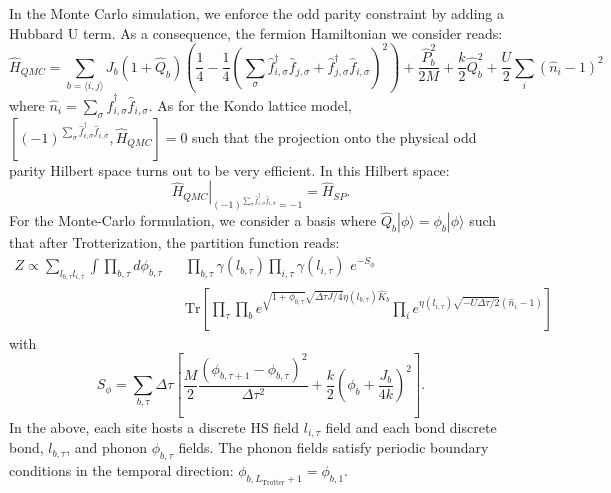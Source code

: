  In the  Monte Carlo  simulation,  we  enforce  the odd parity constraint  by   adding  a  Hubbard  U  term.  As  a  consequence,  the  fermion  Hamiltonian  we  consider  reads: 
 \begin{equation}
	\hat{H}_{QMC}  =       \sum_{b=\langle  i, j \rangle }  J_b   \left( 1 + \hat{Q}_{b} \right)  \left( \frac{1}{4}  -\frac{1}{4} \left( \sum_{\sigma}   \hat{f}^{\dagger}_{i,\sigma}  \hat{f}^{\phantom\dagger}_{j,\sigma}    + \hat{f}^{\dagger}_{j,\sigma}  \hat{f}^{\phantom\dagger}_{i,\sigma}   \right)^2    \right)    +  
	   \frac{\hat{P}_{b} ^2 }{2M}   +    \frac{k}{2} \hat{Q}_{b} ^2      +   \frac{U}{2}\sum_i \left(   \hat{n}_i -1 \right)^2
\end{equation}
where  $\hat{n}_i  =  \sum_{\sigma} \hat{f}^{\dagger}_{i,\sigma}\hat{f}^{\phantom\dagger}_{i,\sigma}$.       As  for the Kondo  lattice  model,   
$\left[ (-1)^{ \sum_{\sigma} \hat{f}^{\dagger}_{i,\sigma}  \hat{f}^{\phantom\dagger}_{i,\sigma} },  \hat{H}_{QMC}  \right]   = 0   $  such  that  the projection
onto the  physical odd  parity  Hilbert  space   turns out  to be  very  efficient.   In this  Hilbert  space: 
\begin{equation}
   \left. \hat{H}_{QMC} \right|_{ (-1)^{ \sum_{\sigma} \hat{f}^{\dagger}_{i,\sigma}  \hat{f}^{\phantom\dagger}_{i,\sigma} }  = -1}  =  \hat{H}_{SP}.
\end{equation}
For  the Monte-Carlo  formulation,  we  consider  a  basis  where  $ \hat{Q}_b  | \phi \rangle =   \phi_b  | \phi \rangle $  such  that   after  Trotterization,  the  partition  function  reads: 
\begin{eqnarray} 
	Z     \propto   \sum_{l_{b,\tau}  l_{i,\tau}}  \int  \prod_{b,\tau} d \phi_{b,\tau}     & &   
	  \prod_{b,\tau} \gamma(l_{b,\tau}) \prod_{i,\tau} \gamma(l_{i,\tau})  \,  \, 
	  e^{-S_{\phi} }   \\  & &   \text{Tr}\left[  \prod_{\tau}     \prod_{b}  e^{ \sqrt{1 + \phi_{b,\tau}}  \sqrt{\Delta  \tau J/4}  \eta(l_{b,\tau})\hat{K}_b }  
	    \prod_{i}  e^{ \eta(l_{i,\tau})  \sqrt{- U \Delta \tau / 2} \left(  \hat{n}_i -  1 \right)} \right]   \nonumber 
\end{eqnarray}
with 
\begin{equation}
	S_{\phi} =   \sum_{b, \tau}  \Delta  \tau \left[  \frac{M}{2} \frac{ \left(  \phi_{b,\tau + 1}  -  \phi_{b,\tau}  \right)^2 } {\Delta  \tau ^2  }  +  \frac{k}{2} \left(  
	\phi_b +  \frac{J_b}{4 k} \right)^2   \right].
\end{equation}
In the  above,   each  site    hosts  a   discrete  HS  field  $l_{i,\tau} $  field  and   each  bond discrete bond,  $l_{b,\tau} $,   and   phonon  $\phi_{b,\tau}$  fields.   The  phonon  fields   satisfy  periodic   boundary  conditions in the  temporal   direction:  $ \phi_{b,L_{\text{Trotter}} + 1 }  = \phi_{b,1 }  $.  


